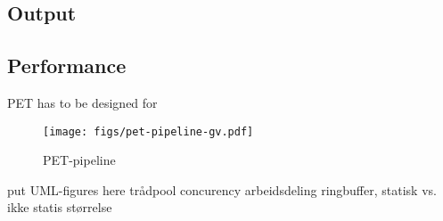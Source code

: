 \subsection{Output}

\subsection{Performance}

PET has to be designed for 

\begin{figure}
    \texttt{[image: figs/pet-pipeline-gv.pdf]}
    \caption{PET-pipeline}
    \label{fig:pipeline}
\end{figure}

put UML-figures here
trådpool
concurency
arbeidsdeling
ringbuffer, statisk vs. ikke statis størrelse


